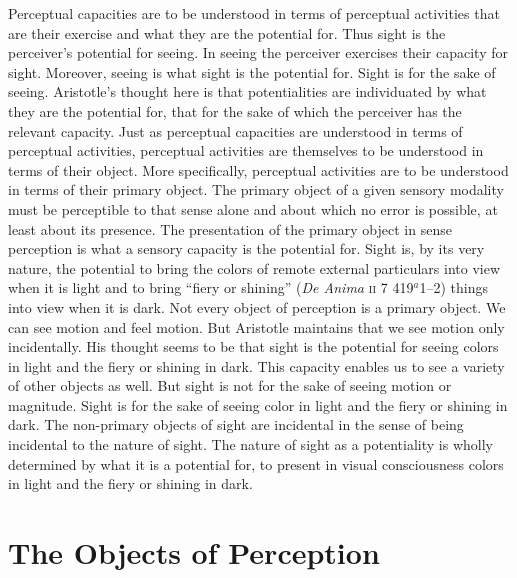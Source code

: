 Perceptual capacities are to be understood in terms of perceptual activities that are their exercise and what they are the potential for. Thus sight is the perceiver's potential for seeing. In seeing the perceiver exercises their capacity for sight. Moreover, seeing is what sight is the potential for. Sight is for the sake of seeing. Aristotle's thought here is that potentialities are individuated by what they are the potential for, that for the sake of which the perceiver has the relevant capacity. Just as perceptual capacities are understood in terms of perceptual activities, perceptual activities are themselves to be understood in terms of their object. More specifically, perceptual activities are to be understood in terms of their primary object. The primary object of a given sensory modality must be perceptible to that sense alone and about which no error is possible, at least about its presence. The presentation of the primary object in sense perception is what a sensory capacity is the potential for. Sight is, by its very nature, the potential to bring the colors of remote external particulars into view when it is light and to bring ``fiery or shining'' (\emph{De Anima} \textsc{ii} 7 419\( ^{a} \)1--2) things into view when it is dark. Not every object of perception is a primary object. We can see motion and feel motion. But Aristotle maintains that we see motion only incidentally. His thought seems to be that sight is the potential for seeing colors in light and the fiery or shining in dark. This capacity enables us to see a variety of other objects as well. But sight is not for the sake of seeing motion or magnitude. Sight is for the sake of seeing color in light and the fiery or shining in dark. The non-primary objects of sight are incidental in the sense of being incidental to the nature of sight. The nature of sight as a potentiality is wholly determined by what it is a potential for, to present in visual consciousness colors in light and the fiery or shining in dark.


\section{The Objects of Perception} %
\label{sec:the_objects_of_perception}


